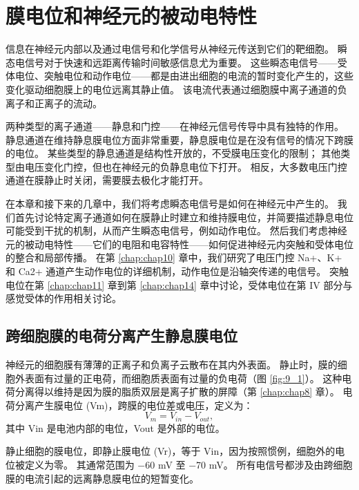 \chapter{膜电位和神经元的被动电特性} \label{chap:chap9}

信息在神经元内部以及通过电信号和化学信号从神经元传送到它们的靶细胞。 
瞬态电信号对于快速和远距离传输时间敏感信息尤为重要。 
这些瞬态电信号——受体电位、突触电位和动作电位——都是由进出细胞的电流的暂时变化产生的，这些变化驱动细胞膜上的电位远离其静止值。 
该电流代表通过细胞膜中离子通道的负离子和正离子的流动。


两种类型的离子通道——静息和门控——在神经元信号传导中具有独特的作用。 
静息通道在维持静息膜电位方面非常重要，静息膜电位是在没有信号的情况下跨膜的电位。 
某些类型的静息通道是结构性开放的，不受膜电压变化的限制； 
其他类型由电压变化门控，但也在神经元的负静息电位下打开。 
相反，大多数电压门控通道在膜静止时关闭，需要膜去极化才能打开。


在本章和接下来的几章中，我们将考虑瞬态电信号是如何在神经元中产生的。 
我们首先讨论特定离子通道如何在膜静止时建立和维持膜电位，并简要描述静息电位可能受到干扰的机制，从而产生瞬态电信号，例如动作电位。 
然后我们考虑神经元的被动电特性——它们的电阻和电容特性——如何促进神经元内突触和受体电位的整合和局部传播。 
在第 \ref{chap:chap10} 章中，我们研究了电压门控 Na+、K+ 和 Ca2+ 通道产生动作电位的详细机制，动作电位是沿轴突传递的电信号。 
突触电位在第 \ref{chap:chap11} 章到第 \ref{chap:chap14} 章中讨论，受体电位在第 IV 部分与感觉受体的作用相关讨论。



\section{跨细胞膜的电荷分离产生静息膜电位}
神经元的细胞膜有薄薄的正离子和负离子云散布在其内外表面。 
静止时，膜的细胞外表面有过量的正电荷，而细胞质表面有过量的负电荷（图 \ref{fig:9_1}）。 
这种电荷分离得以维持是因为膜的脂质双层是离子扩散的屏障（第 \ref{chap:chap8} 章）。 
电荷分离产生膜电位 (Vm)，跨膜的电位差或电压，定义为：
\begin{equation}
	V_m = V_{in} - V_{out},
\end{equation}
其中 Vin 是电池内部的电位，Vout 是外部的电位。

静止细胞的膜电位，即静止膜电位 (Vr)，等于 Vin，因为按照惯例，细胞外的电位被定义为零。 
其通常范围为 −60 mV 至 −70 mV。 
所有电信号都涉及由跨细胞膜的电流引起的远离静息膜电位的短暂变化。

